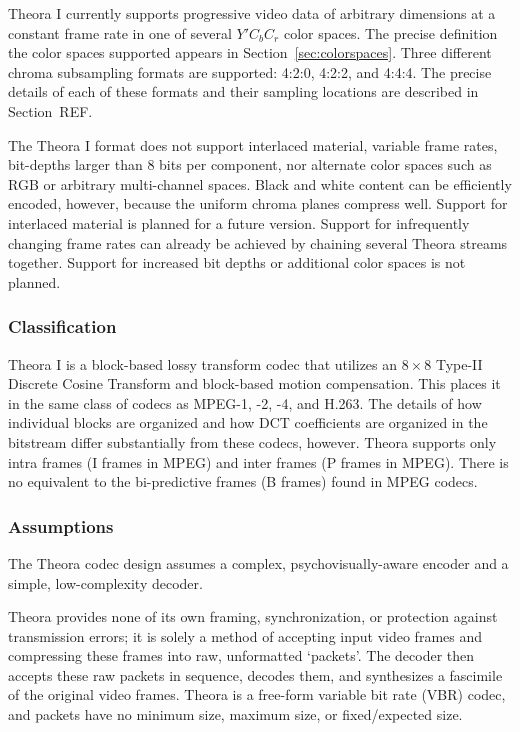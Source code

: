 \documentclass[11pt,letterpaper]{article}
\begin{document}
Theora I currently supports progressive video data of arbitrary dimensions at a
 constant frame rate in one of several $Y'C_bC_r$ color spaces.
The precise definition the color spaces supported appears in
 Section~\ref{sec:colorspaces}.
Three different chroma subsampling formats are supported: 4:2:0, 4:2:2,
 and 4:4:4.
The precise details of each of these formats and their sampling locations are
 described in Section~REF.

The Theora I format does not support interlaced material, variable frame rates,
 bit-depths larger than 8 bits per component, nor alternate color spaces such
 as RGB or arbitrary multi-channel spaces.
Black and white content can be efficiently encoded, however, because the
 uniform chroma planes compress well.
Support for interlaced material is planned for a future version.
Support for infrequently changing frame rates can already be achieved by
 chaining several Theora streams together.
Support for increased bit depths or additional color spaces is not planned.

\subsubsection{Classification}

Theora I is a block-based lossy transform codec that utilizes an
 $8\times 8$ Type-II Discrete Cosine Transform and block-based motion
 compensation.
This places it in the same class of codecs as MPEG-1, -2, -4, and H.263.
The details of how individual blocks are organized and how DCT coefficients are
 organized in the bitstream differ substantially from these codecs, however.
Theora supports only intra frames (I frames in MPEG) and inter frames (P frames
 in MPEG).
There is no equivalent to the bi-predictive frames (B frames) found in MPEG
 codecs.

\subsubsection{Assumptions}

The Theora codec design assumes a complex, psychovisually-aware encoder and a
 simple, low-complexity decoder.

Theora provides none of its own framing, synchronization, or protection against
 transmission errors; it is solely a method of accepting input video frames and
 compressing these frames into raw, unformatted `packets'.
The decoder then accepts these raw packets in sequence, decodes them, and
 synthesizes a fascimile of the original video frames.
Theora is a free-form variable bit rate (VBR) codec, and packets have no
 minimum size, maximum size, or fixed/expected size.
\end{document}
